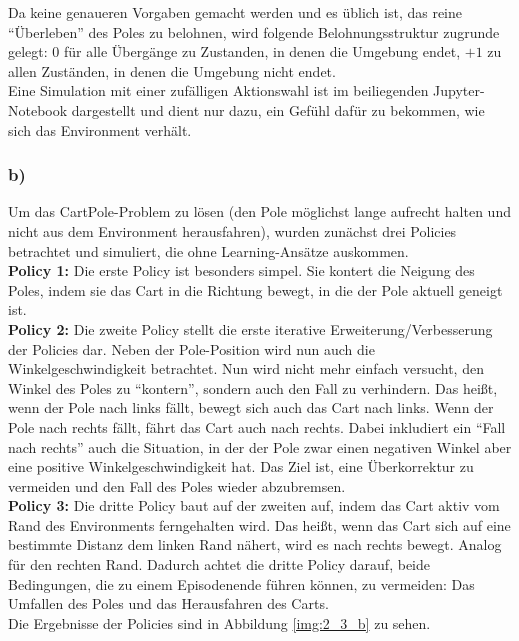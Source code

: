\documentclass[11pt]{article}
\begin{document}
Da keine genaueren Vorgaben gemacht werden und es üblich ist, das reine ``Überleben'' des Poles zu belohnen, wird folgende Belohnungsstruktur zugrunde gelegt: $0$ für alle Übergänge zu Zustanden, in denen die Umgebung endet, $+1$ zu allen Zuständen, in denen die Umgebung nicht endet. \\
Eine Simulation mit einer zufälligen Aktionswahl ist im beiliegenden Jupyter-Notebook dargestellt und dient nur dazu, ein Gefühl dafür zu bekommen, wie sich das Environment verhält.

\subsubsection*{b)}

Um das CartPole-Problem zu lösen (den Pole möglichst lange aufrecht halten und nicht aus dem Environment herausfahren), wurden zunächst drei Policies betrachtet und simuliert, die ohne Learning-Ansätze auskommen.\\
\textbf{Policy 1:} Die erste Policy ist besonders simpel. Sie kontert die Neigung des Poles, indem sie das Cart in die Richtung bewegt, in die der Pole aktuell geneigt ist.\\
\textbf{Policy 2:} Die zweite Policy stellt die erste iterative Erweiterung/Verbesserung der Policies dar. Neben der Pole-Position wird nun auch die Winkelgeschwindigkeit betrachtet. Nun wird nicht mehr einfach versucht, den Winkel des Poles zu ``kontern'', sondern auch den Fall zu verhindern. Das heißt, wenn der Pole nach  links fällt, bewegt sich auch das Cart nach links. Wenn der Pole nach rechts fällt, fährt das Cart auch nach rechts. Dabei inkludiert ein ``Fall nach rechts'' auch die Situation, in der der Pole zwar einen negativen Winkel aber eine positive Winkelgeschwindigkeit hat. Das Ziel ist, eine Überkorrektur zu vermeiden und den Fall des Poles wieder abzubremsen.\\
\textbf{Policy 3:} Die dritte Policy baut auf der zweiten auf, indem das Cart aktiv vom Rand des Environments ferngehalten wird. Das heißt, wenn das Cart sich auf eine bestimmte Distanz dem linken Rand nähert, wird es nach rechts bewegt. Analog für den rechten Rand. Dadurch achtet die dritte Policy darauf, beide Bedingungen, die zu einem Episodenende führen können, zu vermeiden: Das Umfallen des Poles und das Herausfahren des Carts.\\
Die Ergebnisse der Policies sind in Abbildung \ref{img:2_3_b} zu sehen.
\end{document}
